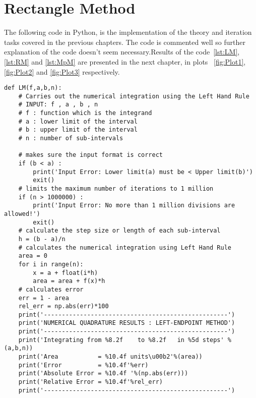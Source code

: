 \documentclass[a4paper, 12pt]{report}
\begin{document}
\section{Rectangle Method}
The following code in Python, is the implementation of the theory and iteration tasks covered in the previous chapters. The code is commented well so further explanation of the code doesn't seem necessary.Results of the code~\ref{lst:LM}, \ref{lst:RM} and \ref{lst:MpM} are presented in the next chapter, in plots  ~\ref{fig:Plot1}, \ref{fig:Plot2} and \ref{fig:Plot3} respectively.
\begin{lstlisting}
def LM(f,a,b,n):
    # Carries out the numerical integration using the Left Hand Rule
    # INPUT: f , a , b , n
    # f : function which is the integrand
    # a : lower limit of the interval
    # b : upper limit of the interval
    # n : number of sub-intervals

    # makes sure the input format is correct
    if (b < a) :
        print('Input Error: Lower limit(a) must be < Upper limit(b)')
        exit()
    # limits the maximum number of iterations to 1 million
    if (n > 1000000) :
        print('Input Error: No more than 1 million divisions are allowed!')
        exit()
    # calculate the step size or length of each sub-interval
    h = (b - a)/n
    # calculates the numerical integration using Left Hand Rule
    area = 0
    for i in range(n):
        x = a + float(i*h)
        area = area + f(x)*h
    # calculates error
    err = 1 - area
    rel_err = np.abs(err)*100
    print('---------------------------------------------------')
    print('NUMERICAL QUADRATURE RESULTS : LEFT-ENDPOINT METHOD')
    print('---------------------------------------------------')
    print('Integrating from %8.2f    to %8.2f   in %5d steps' %(a,b,n))
    print('Area           = %10.4f units\u00b2'%(area))
    print('Error          = %10.4f'%err)
    print('Absolute Error = %10.4f '%(np.abs(err)))
    print('Relative Error = %10.4f'%rel_err)
    print('---------------------------------------------------')
\end{lstlisting}
\end{document}
